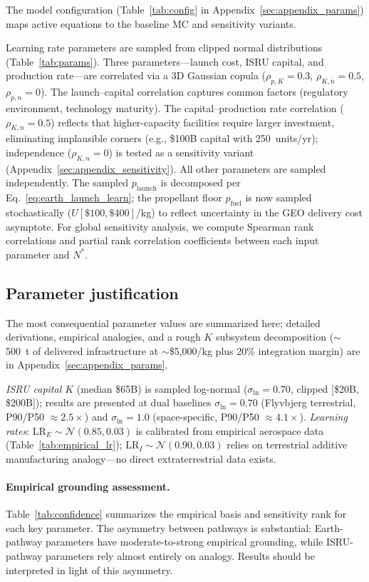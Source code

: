 \documentclass[preprint,12pt]{elsarticle}
\begin{document}
The model configuration (Table~\ref{tab:config} in Appendix~\ref{sec:appendix_params}) maps active equations to the baseline MC and sensitivity variants.

Learning rate parameters are sampled from clipped normal distributions (Table~\ref{tab:params}). Three parameters---launch cost, ISRU capital, and production rate---are correlated via a 3D Gaussian copula ($\rho_{p,K} = 0.3$, $\rho_{K,\dot{n}} = 0.5$, $\rho_{p,\dot{n}} = 0$). The launch--capital correlation captures common factors (regulatory environment, technology maturity). The capital--production rate correlation ($\rho_{K,\dot{n}} = 0.5$) reflects that higher-capacity facilities require larger investment, eliminating implausible corners (e.g., \$100B capital with 250~units/yr); independence ($\rho_{K,\dot{n}} = 0$) is tested as a sensitivity variant (Appendix~\ref{sec:appendix_sensitivity}). All other parameters are sampled independently. The sampled $p_{\mathrm{launch}}$ is decomposed per Eq.~\ref{eq:earth_launch_learn}; the propellant floor $p_{\mathrm{fuel}}$ is now sampled stochastically ($U[\$100, \$400]$/kg) to reflect uncertainty in the GEO delivery cost asymptote. For global sensitivity analysis, we compute Spearman rank correlations and partial rank correlation coefficients between each input parameter and $N^*$.

\subsection{Parameter justification}
\label{sec:param_justification}

The most consequential parameter values are summarized here; detailed derivations, empirical analogies, and a rough $K$ subsystem decomposition (${\sim}$500~t of delivered infrastructure at ${\sim}$\$5{,}000/kg plus 20\% integration margin) are in Appendix~\ref{sec:appendix_params}.

\emph{ISRU capital $K$} (median \$65B) is sampled log-normal ($\sigma_{\ln} = 0.70$, clipped [\$20B, \$200B]); results are presented at dual baselines $\sigma_{\ln} = 0.70$ (Flyvbjerg terrestrial, P90/P50 $\approx 2.5\times$) and $\sigma_{\ln} = 1.0$ (space-specific, P90/P50 $\approx 4.1\times$). \emph{Learning rates}: $\mathrm{LR}_E \sim \mathcal{N}(0.85, 0.03)$ is calibrated from empirical aerospace data (Table~\ref{tab:empirical_lr}); $\mathrm{LR}_I \sim \mathcal{N}(0.90, 0.03)$ relies on terrestrial additive manufacturing analogy---no direct extraterrestrial data exists.

\paragraph{Empirical grounding assessment.} Table~\ref{tab:confidence} summarizes the empirical basis and sensitivity rank for each key parameter. The asymmetry between pathways is substantial: Earth-pathway parameters have moderate-to-strong empirical grounding, while ISRU-pathway parameters rely almost entirely on analogy. Results should be interpreted in light of this asymmetry.
\end{document}
